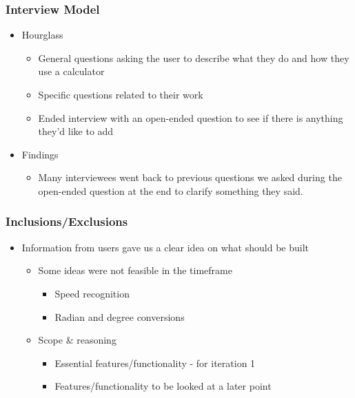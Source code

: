\documentclass{beamer}
\begin{document}
  \begin{frame}
  \frametitle{Interview Model}
  \begin{itemize}
   \item Hourglass
    \begin{itemize}
     \item General questions asking the user to describe what they do and how they use a calculator
     \item Specific questions related to their work
     \item Ended interview with an open-ended question to see if there is anything they'd like to add
    \end{itemize}
   \item Findings
    \begin{itemize}
     \item Many interviewees went back to previous questions we asked during the open-ended question at the end to clarify something they said.
    \end{itemize}
  \end{itemize}
  \end{frame}



  \begin{frame}
  \frametitle{Inclusions/Exclusions}
  \begin{itemize}
   \item Information from users gave us a clear idea on what should be built
    \begin{itemize}
    \item Some ideas were not feasible in the timeframe
    \begin{itemize}
      \item Speed recognition
      \item Radian and degree conversions
    \end{itemize}
    \item Scope \& reasoning
      \begin{itemize}
      \item Essential features/functionality - for iteration 1
      \item Features/functionality to be looked at a later point
    \end{itemize}
    \end{itemize}
    \end{itemize}
  \end{frame}
\end{document}
